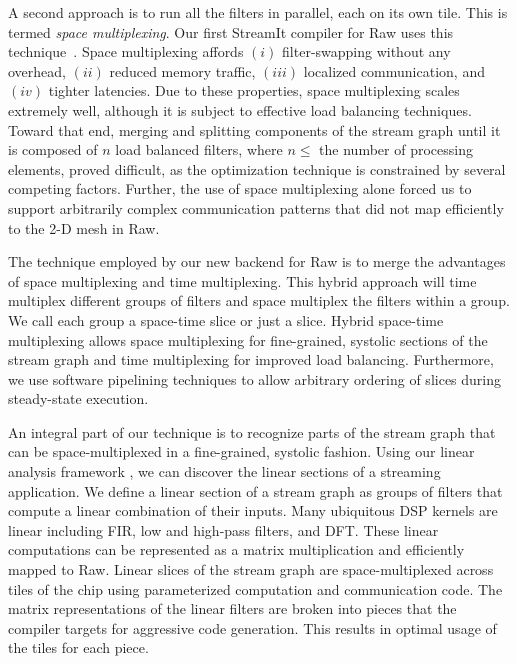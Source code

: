 \documentclass{csailabstractbook}
\begin{document}
A second approach is to run all the filters in parallel, each on its
own tile.  This is termed {\it space multiplexing}.  Our first
StreamIt compiler for Raw uses this technique~\cite{streamit-asplos}.
Space multiplexing affords $(i)$ filter-swapping without any overhead,
$(ii)$ reduced memory traffic, $(iii)$ localized communication, and
$(iv)$ tighter latencies.  Due to these properties, space multiplexing
scales extremely well, although it is subject to effective load balancing 
techniques. Toward that end, merging and
splitting components of the stream graph until it is composed of
$n$ load balanced filters, where $n \le$ the number of processing elements,
proved difficult, as the optimization technique is constrained by
several competing factors.  Further, the use of space multiplexing
alone forced us to support arbitrarily complex communication patterns 
that did not map efficiently to the 2-D mesh in Raw.

The technique employed by our new backend for Raw is to merge the
advantages of space multiplexing and time multiplexing.  This hybrid
approach will time multiplex different groups of filters and space
multiplex the filters within a group. We call each group a space-time
slice or just a slice.  Hybrid space-time multiplexing allows space
multiplexing for fine-grained, systolic sections of the stream graph
and time
multiplexing for improved load balancing.  Furthermore, we use
software pipelining techniques to allow arbitrary ordering of slices
during steady-state execution.

An integral part of our technique is to recognize parts of the stream
graph that can be space-multiplexed in a fine-grained, systolic
fashion.  Using our linear analysis framework \cite{lamb03}, we can
discover the linear sections of a streaming application.  We define a
linear section of a stream graph as groups of filters that
compute a linear combination of their inputs.  Many ubiquitous DSP
kernels are linear including FIR, low and high-pass filters, and DFT.
These linear computations can be represented as a matrix
multiplication and efficiently mapped to Raw.  Linear slices of the
stream graph are space-multiplexed across tiles of the chip using
parameterized computation and communication code.  The matrix
representations of the linear filters are broken into pieces that the
compiler targets for aggressive code generation.  This results in
optimal usage of the tiles for each piece.
\end{document}
